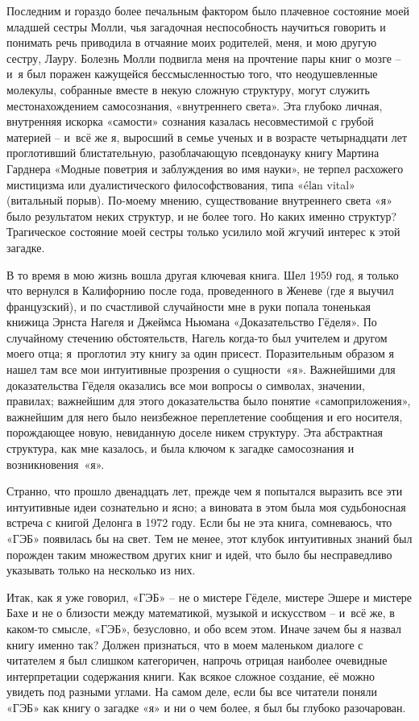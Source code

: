 \documentclass[../main.tex]{subfiles}
\begin{document}
Последним и гораздо более печальным фактором было плачевное состояние моей младшей сестры Молли, чья загадочная неспособность научиться говорить и понимать речь приводила в отчаяние моих родителей, меня, и мою другую сестру, Лауру. Болезнь Молли подвигла меня на прочтение пары книг о мозге \--- и~я был поражен кажущейся бессмысленностью того, что неодушевленные молекулы, собранные вместе в некую сложную структуру, могут служить местонахождением самосознания, «внутреннего света». Эта глубоко личная, внутренняя искорка «самости» сознания казалась несовместимой с грубой материей \--- и~всё же я, выросший в семье ученых и в возрасте четырнадцати лет проглотивший блистательную, разоблачающую псевдонауку книгу Мартина Гарднера «Модные поветрия и заблуждения во имя науки», не терпел расхожего мистицизма или дуалистического философствования, типа «\'elаn vital» (витальный порыв). По-моему мнению, существование внутреннего света «я» было результатом неких структур, и не более того. Но каких именно структур? Трагическое состояние моей сестры только усилило мой жгучий интерес к этой загадке.

В то время в мою жизнь вошла другая ключевая книга. Шел 1959 год, я только что вернулся в Калифорнию после года, проведенного в Женеве (где я выучил французский), и по счастливой случайности мне в руки попала тоненькая книжица Эрнста Нагеля и Джеймса Ньюмана «Доказательство Гёделя». По случайному стечению обстоятельств, Нагель когда-то был учителем и другом моего отца; я~проглотил эту книгу за один присест. Поразительным образом я нашел там все мои интуитивные прозрения о сущности~«я». Важнейшими для доказательства Гёделя оказались все мои вопросы о символах, значении, правилах; важнейшим для этого доказательства было понятие «самоприложения», важнейшим для него было неизбежное переплетение сообщения и его носителя, порождающее новую, невиданную доселе никем структуру. Эта абстрактная структура, как мне казалось, и была ключом к загадке самосознания и возникновения~«я».

Странно, что прошло двенадцать лет, прежде чем я попытался выразить все эти интуитивные идеи сознательно и ясно; а виновата в этом была моя судьбоносная встреча с книгой Делонга в 1972 году. Если бы не эта книга, сомневаюсь, что «ГЭБ» появилась бы на свет. Тем не менее, этот клубок интуитивных знаний был порожден таким множеством других книг и идей, что было бы несправедливо указывать только на несколько из них.

Итак, как я уже говорил, «ГЭБ» \--- не о мистере Гёделе, мистере Эшере и мистере Бахе и не о близости между математикой, музыкой и искусством \--- и~всё же, в каком-то смысле, «ГЭБ», безусловно, и обо всем этом. Иначе зачем бы я назвал книгу именно так? Должен признаться, что в моем маленьком диалоге с читателем я был слишком категоричен, напрочь отрицая наиболее очевидные интерпретации содержания книги. Как всякое сложное создание, её можно увидеть под разными углами. На самом деле, если бы все читатели поняли «ГЭБ» как книгу о загадке «я» и ни о чем более, я был бы глубоко разочарован.
\end{document}
